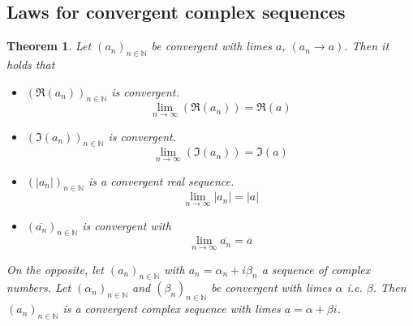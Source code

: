 \documentclass[a4paper,landscape,twocolumn]{article}
\newtheorem{theorem}{Theorem}
\newcommand\abs[1]{\left|#1\right|}
\newcommand\seq[1]{{\left(#1\right)}_{n \in \mathbb N}}
\begin{document}
\subsection{Laws for convergent complex sequences}
%
\begin{theorem}
  Let $(a_n)_{n \in \mathbb N}$ be convergent with limes $a$, $(a_n \rightarrow a)$. Then it holds that
  \begin{itemize}
    \item $\left(\Re(a_n)\right)_{n \in \mathbb N}$ is convergent.
      \[ \lim_{n \to \infty} \left(\Re(a_n)\right) = \Re(a) \]
    \item $\left(\Im(a_n)\right)_{n \in \mathbb N}$ is convergent.
      \[ \lim_{n \to \infty} \left(\Im(a_n)\right) = \Im(a) \]
    \item $\left(\abs{a_n}\right)_{n \in \mathbb N}$ is a convergent real sequence.
      \[ \lim_{n \to \infty} \abs{a_n} = \abs{a} \]
    \item $\left(\overline{a_n}\right)_{n \in \mathbb N}$ is convergent with
      \[ \lim_{n \to \infty} \overline{a_n} = \overline{a} \]
  \end{itemize}

  On the opposite, let $\seq{a_n}$ with $a_n = \alpha_n + i \beta_n$ a sequence of complex numbers.
  Let $\seq{\alpha_n}$ and $\seq{\beta_n}$ be convergent with limes $\alpha$ i.e. $\beta$.
  Then $\seq{a_n}$ is a convergent complex sequence with limes $a = \alpha+\beta i$.
\end{theorem}
\end{document}
